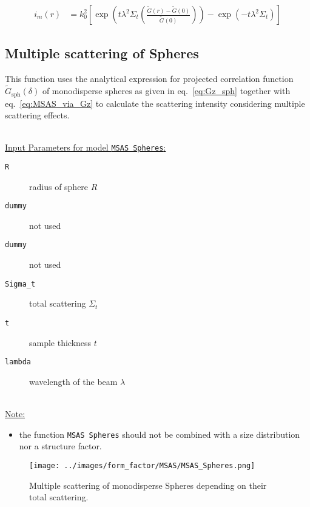 \begin{align}
 i_m(r) &= k_0^2\left[\exp\left(t\lambda^2\Sigma_t\left(\frac{\tilde{G}(r)-\tilde{G}(0)}{\tilde{G}(0)}\right)\right)-\exp\left(-t\lambda^2\Sigma_t\right)\right]
 \label{eq:MSAS_via_Gz}
\end{align}

\newpage
\subsection{Multiple scattering of Spheres}

This function uses the analytical expression for projected correlation function $\tilde{G}_\mathrm{sph}(\delta)$ of monodisperse spheres as given in eq.\ \ref{eq:Gz_sph} together with eq.\ \ref{eq:MSAS_via_Gz} to calculate the scattering intensity considering multiple scattering effects.

\hspace{1pt}\\
\uline{Input Parameters for model \texttt{MSAS Spheres}:}\\
\begin{description}
\item[\texttt{R}] radius of sphere $R$
\item[\texttt{dummy}] not used
\item[\texttt{dummy}] not used
\item[\texttt{Sigma\_t}] total scattering $\Sigma_t$
\item[\texttt{t}] sample thickness $t$
\item[\texttt{lambda}] wavelength of the beam $\lambda$
\end{description}

\hspace{1pt}\\
\uline{Note:}
\begin{itemize}
\item the function \texttt{MSAS Spheres} should not be combined with a size distribution nor a structure factor.
\end{itemize}

\begin{figure}[htb]
\begin{center}
\texttt{[image: ../images/form\_factor/MSAS/MSAS\_Spheres.png]}
\end{center}
\caption{Multiple scattering of monodisperse Spheres depending on their total scattering.}
\label{fig:MSAS_Spheres}
\end{figure}

